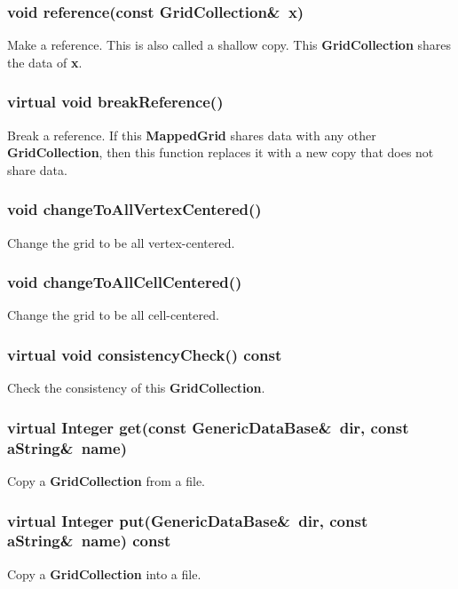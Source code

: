 \documentclass{article}
\begin{document}
  \subsubsection{void reference(const GridCollection\&~x)}
  \label{GridCollection::reference(x)}
    Make a reference.  This is also called a shallow copy.  This \textbf{GridCollection} shares the data of \textbf{x}.

  \subsubsection{virtual void breakReference()}
  \label{GridCollection::breakReference()}
    Break a reference.  If this \textbf{MappedGrid} shares data with any other \textbf{GridCollection},
    then this function replaces it with a new copy that does not share data.

  \subsubsection{void changeToAllVertexCentered()}
  \label{GridCollection::changeToAllVertexCentered()}
    Change the grid to be all vertex-centered.

  \subsubsection{void changeToAllCellCentered()}
  \label{GridCollection::changeToAllCellCentered()}
    Change the grid to be all cell-centered.

  \subsubsection{virtual void consistencyCheck() const}
  \label{GridCollection::consistencyCheck() const}
    Check the consistency of this \textbf{GridCollection}.

  \subsubsection{virtual Integer get(const GenericDataBase\&~dir, const aString\&~name)}
  \label{GridCollection::get(dir,name)}
    Copy a \textbf{GridCollection} from a file.

  \subsubsection{virtual Integer put(GenericDataBase\&~dir, const aString\&~name) const}
  \label{GridCollection::put(dir,name) const}
    Copy a \textbf{GridCollection} into a file.
\end{document}
